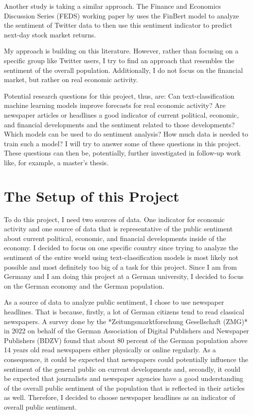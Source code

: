 \documentclass[11pt, a4paper, leqno]{article}
\begin{document}
Another study is taking a similar approach. The Finance and Economics Discussion Series (FEDS) working paper by \textcite{Adams_2023} uses the FinBert model to analyze the sentiment of Twitter data to then use this sentiment indicator to predict next-day stock market returns.

My approach is building on this literature. However, rather than focusing on a specific group like Twitter users, I try to find an approach that resembles the sentiment of the overall population. Additionally, I do not focus on the financial market, but rather on real economic activity.

Potential research questions for this project, thus, are: Can text-classification machine learning models improve forecasts for real economic activity? Are newspaper articles or headlines a good indicator of current political, economic, and financial developments and the sentiment related to those developments? Which models can be used to do sentiment analysis? How much data is needed to train such a model?
I will try to answer some of these questions in this project. These questions can then be, potentially, further investigated in follow-up work like, for example, a master's thesis.

\section{The Setup of this Project}

To do this project, I need two sources of data. One indicator for economic activity and one source of data that is representative of the public sentiment about current political, economic, and financial developments inside of the economy. I decided to focus on one specific country since trying to analyze the sentiment of the entire world using text-classification models is most likely not possible and most definitely too big of a task for this project. Since I am from Germany and I am doing this project at a German university, I decided to focus on the German economy and the German population.

As a source of data to analyze public sentiment, I chose to use newspaper headlines. That is because, firstly, a lot of German citizens tend to read classical newspapers. A survey done by the *Zeitungsmarktforschung Gesellschaft (ZMG)* in 2022 on behalf of the German Association of Digital Publishers and Newspaper Publishers (BDZV) found that about 80 percent of the German population above 14 years old read newspapers either physically or online regularly. As a consequence, it could be expected that newspapers could potentially influence the sentiment of the general public on current developments and, secondly, it could be expected that journalists and newspaper agencies have a good understanding of the overall public sentiment of the population that is reflected in their articles as well. Therefore, I decided to choose newspaper headlines as an indicator of overall public sentiment.
\end{document}
